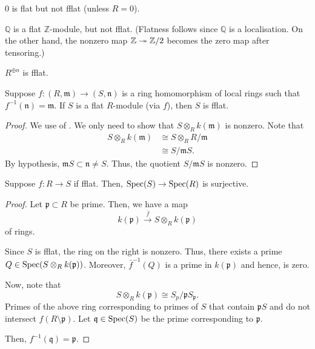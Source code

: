 \documentclass[12pt]{article}
\begin{document}
\begin{ex}
	$0$ is flat but not fflat (unless $R = 0$).

	$\mathbb{Q}$ is a flat $\mathbb{Z}$-module, but not fflat. (Flatness follows since $\mathbb{Q}$ is a localisation. On the other hand, the nonzero map $\mathbb{Z} \twoheadrightarrow \mathbb{Z}/2$ becomes the zero map after tensoring.)

	$R^{\oplus n}$ is fflat.
\end{ex}

\begin{lem} \label{lem:local-flat-fflat}
	Suppose $f : (R, \mathfrak{m}) \to (S, \mathfrak{n})$ is a ring homomorphism of local rings such that $f^{-1}(\mathfrak{n}) = \mathfrak{m}$. \newline
	If $S$ is a flat $R$-module (via $f$), then $S$ is fflat.
\end{lem}
\begin{proof} 
	We use  of . We only need to show that $S \otimes_{R} k(\mathfrak{m})$ is nonzero. Note that
	\begin{align*} 
		S \otimes_{R} k(\mathfrak{m}) &\cong S \otimes_{R} R/\mathfrak{m} \\
		&\cong S/\mathfrak{m}S.
	\end{align*}
	By hypothesis, $\mathfrak{m} S \subset \mathfrak{n} \neq S$. Thus, the quotient $S/\mathfrak{m} S$ is nonzero.
\end{proof}

\begin{thm}
	Suppose $f : R \to S$ if fflat. Then, $\operatorname{Spec}(S) \to \operatorname{Spec}(R)$ is surjective.
\end{thm}
\begin{proof} 
	Let $\mathfrak{p} \subset R$ be prime. Then, we have a map
	\begin{equation*} 
		k(\mathfrak{p}) \xrightarrow{\bar{f}} S \otimes_{R} k(\mathfrak{p})
	\end{equation*}
	of rings. 

	Since $S$ is fflat, the ring on the right is nonzero. Thus, there exists a prime $Q \in \operatorname{Spec}(S \otimes_{R} k(\mathfrak{p}))$. Moreover, $\bar{f}^{-1}(Q)$ is a prime in $k(\mathfrak{p})$ and hence, is zero.

	Now, note that
	\begin{equation*} 
		S \otimes_{R} k(\mathfrak{p}) \cong S_{p}/\mathfrak{p} S_{\mathfrak{p}}.
	\end{equation*}
	Primes of the above ring corresponding to primes of $S$ that contain $\mathfrak{p} S$ and do not intersect $f(R \setminus \mathfrak{p})$. Let $\mathfrak{q} \in \operatorname{Spec}(S)$ be the prime corresponding to $\mathfrak{p}$. 

	Then, $f^{-1}(\mathfrak{q}) = \mathfrak{p}$.	
\end{proof}
\end{document}
